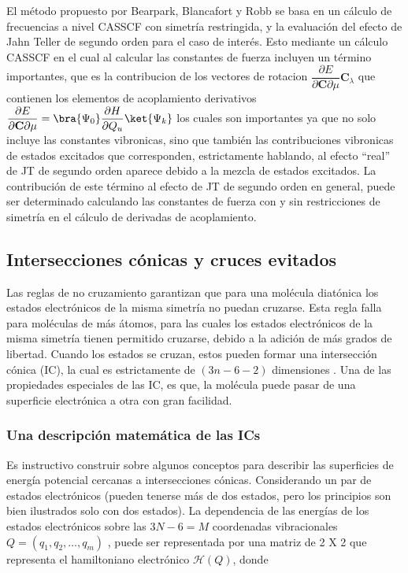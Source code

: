 \documentclass[12pt]{report}
\begin{document}
El método propuesto por Bearpark, Blancafort y Robb \cite{Bearpark2002} se basa en un cálculo de frecuencias a nivel CASSCF con simetría restringida, y la evaluación del efecto de Jahn Teller de segundo orden para el caso de interés.
Esto mediante un cálculo CASSCF en el cual al calcular las constantes de fuerza incluyen un término importantes, que es la  contribucion de los vectores de rotacion $\dfrac{\partial E}{\partial\textbf{C}     \partial \mu} \textbf{C}_\lambda $ que contienen los elementos de acoplamiento derivativos $ \dfrac{\partial E}{\partial \textbf{C} \partial \mu} =\bra{\Psi_0}\dfrac{\partial H}{\partial Q_u}\ket{\Psi_k}$ los cuales son importantes ya que no solo incluye las constantes vibronicas, sino que también las contribuciones vibronicas de estados excitados que corresponden, estrictamente hablando, al efecto “real” de JT de segundo orden aparece debido a la mezcla de estados excitados. La contribución de este término al efecto de JT de segundo orden en general, puede ser determinado calculando las constantes de fuerza con y sin restricciones de simetría en el cálculo de derivadas de acoplamiento. 
\\



\subsection{Intersecciones cónicas y cruces evitados}

Las reglas de no cruzamiento garantizan que para una molécula diatónica los estados electrónicos de la misma simetría no puedan cruzarse. Esta regla falla para moléculas de más átomos, para las cuales los estados electrónicos de la misma simetría tienen permitido cruzarse, debido a la adición de más grados de libertad. Cuando los estados se cruzan, estos pueden formar una intersección cónica (IC), la cual es estrictamente de $(3n-6-2)$ dimensiones \cite{Applegate2003}. Una de las propiedades especiales de las IC, es que, la molécula puede pasar de una superficie electrónica a otra con gran facilidad. 

\newpage

\subsubsection{Una descripción matemática de las ICs}

Es instructivo construir sobre algunos conceptos para describir las superficies de energía potencial cercanas a intersecciones cónicas. Considerando un par de estados electrónicos (pueden tenerse más de dos estados, pero los principios son bien ilustrados solo con dos estados). La dependencia de las energías de los estados electrónicos sobre las $3N-6=M$ coordenadas vibracionales  $Q=(q_1,q_2,…,q_m )$ , puede ser representada por una matriz de 2 X 2 que representa el hamiltoniano electrónico $\mathcal{H}(Q)$, donde 
\end{document}
